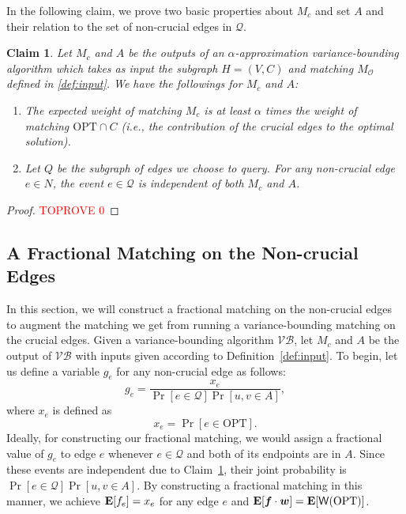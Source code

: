 \documentclass[letterpaper,11pt]{article}
\DeclareMathOperator{\E}{\ensuremath{\normalfont \textbf{E}}}
\newcommand{\mc}[1]{\ensuremath{\mathcal{#1}}}
\newcommand{\opt}[0]{\text{OPT}}
\newcommand{\weight}[0]{{\sf{W}}}
\newcommand{\VB}[0]{\ensuremath{\mathcal{VB}}}
\newtheorem{claim}[lemma]{Claim}
\renewcommand{\mc}[1]{\ensuremath{\mathcal{#1}}}
\begin{document}
In the following claim, we prove two basic properties about $M_c$ and set $A$ and their relation to the set of non-crucial edges in $\mc{Q}$.
\begin{claim}\label{claim:approx-ind}
     Let  $M_c$ and $A$ be the outputs of an $\alpha$-approximation variance-bounding algorithm which takes as input 
 the subgraph $H=(V, C)$ and matching $M_{\mc{O}}$ defined in \ref{def:input}. We have the followings for $M_c$ and $A$:
 \begin{enumerate}
     \item The expected weight of matching $M_c$ is at least $\alpha$ times the weight of matching $\opt\cap C$ (i.e., the contribution of the crucial edges to the optimal solution).
     \item Let $Q$ be the subgraph of edges we choose to query. For any non-crucial edge $e\in N$, the event $e\in \mc{Q}$ is independent of both  $M_c$ and $A$.
 \end{enumerate}
\end{claim}

\begin{proof}\textcolor{red}{TOPROVE 0}\end{proof}




\subsection{A Fractional Matching on the Non-crucial Edges}\label{sec:sec_five}
In this section, we will construct a fractional matching on the non-crucial edges to augment the matching  we get from running a variance-bounding matching on the crucial edges.
Given a variance-bounding algorithm \VB, let $M_c$ and $A$ be the output of $\VB$ with inputs given according to Definition~\ref{def:input}. To begin, let us define a variable $g_e$ for any non-crucial edge as follows:
\begin{equation}
g_e= \frac{x_e}{\Pr[e\in \mc{Q}]\Pr[{u,v}\in A]},
\end{equation}
where $x_e$ is defined as $$x_e= \Pr[e\in \opt].$$ Ideally, for constructing our fractional matching, we would assign a fractional value of $g_e$ to edge $e$ whenever $e\in \mc{Q}$ and both of its endpoints are in $A$. Since these events are independent due to Claim~\ref{claim:approx-ind}, their joint probability is $\Pr[e\in \mc{Q}]\Pr[{u,v}\in A]$. By constructing a fractional matching in this manner, we achieve $\E[f_e]=x_e$ for any edge $e$ and $\E[\bm{f}\cdot\bm{w}] = \E[\weight(\opt)]$. 
\end{document}
